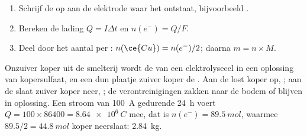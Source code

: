 \begin{method}\label{met:g12:cells-and-electrolysis:mass}
\begin{enumerate}
  \item Schrijf de  op aan de elektrode waar het 
        ontstaat, bijvoorbeeld .
  \item Bereken de lading $Q = I \Delta t$ en $n(e^-) = Q/F$.
  \item Deel door het aantal  per : $n(\ce{Cu}) =
        n(e^-)/2$; daarna $m = n \times M$.
\end{enumerate}
\end{method}


\begin{example}\label{ex:g12:cells-and-electrolysis:refining}
Onzuiver koper uit de smelterij wordt de  van een elektrolysecel in
een oplossing van kopersulfaat, en een dun plaatje zuiver koper de
. Aan de  lost koper op, ; aan de
 slaat zuiver koper neer, ; de
verontreinigingen zakken naar de bodem of blijven in oplossing. Een
stroom van \qty{100}{A} gedurende
\qty{24}{h} voert $Q = 100 \times 86400 = \qty{8.64e6}{C}$ mee, dat is
$n(e^-) = \qty{89.5}{mol}$, waarmee $89.5/2 = \qty{44.8}{mol}$ koper
neerslaat: \qty{2.84}{kg}.
\end{example}

